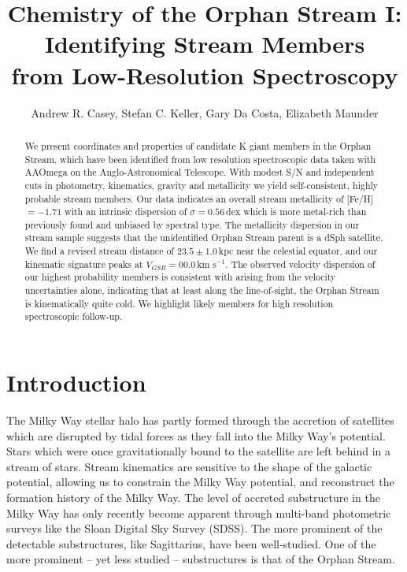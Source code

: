 \documentclass{emulateapj}
\begin{document}
\title{Chemistry of the Orphan Stream I: Identifying Stream Members \\ from Low-Resolution Spectroscopy}

\author{Andrew R. Casey, Stefan C. Keller, Gary Da Costa, Elizabeth Maunder}

\begin{abstract}
We present coordinates and properties of candidate K giant members in the Orphan Stream, which have been identified from low resolution spectroscopic data taken with AAOmega on the Anglo-Astronomical Telescope. With modest S/N and independent cuts in photometry, kinematics, gravity and metallicity we yield self-consistent, highly probable stream members. Our data indicates an overall stream metallicity of [Fe/H] $= -1.71$ with an intrinsic dispersion of $\sigma = 0.56$\,dex which is more metal-rich than previously found and unbiased by spectral type. The metallicity dispersion in our stream sample suggests that the unidentified Orphan Stream parent is a dSph satellite. We find a revised stream distance of $23.5 \pm 1.0$\,kpc near the celestial equator, and our kinematic signature peaks at $V_{GSR} = 00.0$\,km s$^{-1}$. The observed velocity dispersion of our highest probability members is consistent with arising from the velocity uncertainties alone, indicating that at least along the line-of-sight, the Orphan Stream is kinematically quite cold. We highlight likely members for high resolution spectroscopic follow-up.
\end{abstract}


\section{Introduction}
\label{sec:introduction}

The Milky Way stellar halo has partly formed through the accretion of satellites which are disrupted by tidal forces as they fall into the Milky Way's potential. Stars which were once gravitationally bound to the satellite are left behind in a stream of stars. Stream kinematics are sensitive to the shape of the galactic potential, allowing us to constrain the Milky Way potential, and reconstruct the formation history of the Milky Way. The level of accreted substructure in the Milky Way has only recently become apparent through multi-band photometric surveys like the Sloan Digital Sky Survey (SDSS). The more prominent of the detectable substructures, like Sagittarius, have been well-studied. One of the more prominent \--- yet less studied \--- substructures is that of the Orphan Stream. 
\end{document}
